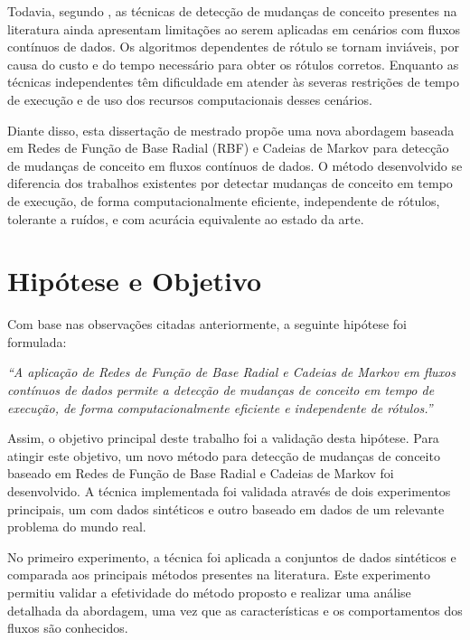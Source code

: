 \documentclass[msc, classic, a4paper]{ufbathesis}
\begin{document}
Todavia, segundo ,
as técnicas de detecção de mudanças de conceito presentes na literatura ainda apresentam limitações ao serem aplicadas em cenários com fluxos contínuos de dados.
%
Os algoritmos dependentes de rótulo se tornam inviáveis, por causa do custo e do tempo necessário para obter os rótulos corretos.
%
Enquanto as técnicas independentes têm dificuldade em atender às severas restrições de tempo de execução e de uso dos recursos computacionais desses cenários.

Diante disso, esta dissertação de mestrado propõe uma nova abordagem baseada em Redes de Função de Base Radial (RBF) e Cadeias de Markov
para detecção de mudanças de conceito em fluxos contínuos de dados.
O método desenvolvido se diferencia dos trabalhos existentes por detectar mudanças de conceito em tempo de execução,
de forma computacionalmente eficiente, independente de rótulos, tolerante a ruídos, e com acurácia equivalente ao estado da arte.

\section{Hipótese e Objetivo}

Com base nas observações citadas anteriormente, a seguinte hipótese foi formulada:

\begin{center}
\textit{``A aplicação de Redes de Função de Base Radial e Cadeias de Markov em fluxos contínuos de dados permite a detecção de mudanças de conceito em tempo de execução, de forma computacionalmente eficiente e independente de rótulos.''}
\end{center}

Assim, o objetivo principal deste trabalho foi a validação desta hipótese.
Para atingir este objetivo, um novo método para detecção de mudanças de conceito baseado em Redes de Função de Base Radial e Cadeias de Markov foi desenvolvido.
A técnica implementada foi validada através de dois experimentos principais, um com dados sintéticos e outro baseado em dados de um relevante problema do mundo real.

No primeiro experimento, a técnica foi aplicada a conjuntos de dados sintéticos e
comparada aos principais métodos presentes na literatura.
Este experimento permitiu validar a efetividade do método proposto e realizar uma análise detalhada da abordagem,
uma vez que as características e os comportamentos dos fluxos são conhecidos.
\end{document}
